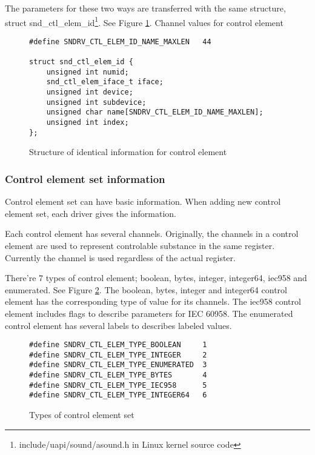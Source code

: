 \documentclass[onecolumn]{article}
\begin{document}
The parameters for these two ways are transferred with the same structure, struct snd\_ctl\_elem\_id\footnote{include/uapi/sound/asound.h in Linux kernel source code}. See Figure \ref{fig:control-element-id}.
Channel values for control element
\begin{figure}[htbp]
\small
\begin{verbatim}
#define SNDRV_CTL_ELEM_ID_NAME_MAXLEN	44

struct snd_ctl_elem_id {
    unsigned int numid;
    snd_ctl_elem_iface_t iface;
    unsigned int device;
    unsigned int subdevice;
    unsigned char name[SNDRV_CTL_ELEM_ID_NAME_MAXLEN];
    unsigned int index;
};
\end{verbatim}
\caption{{Structure of identical information for control element}}
\label{fig:control-element-id}
\end{figure}


\subsubsection{Control element set information}

Control element set can have basic information. When adding new control element set, each driver gives the information.

Each control element has several channels. Originally, the channels in a control element are used to represent controlable substance in the same register. Currently the channel is used regardless of the actual register.

There're 7 types of control element; boolean, bytes, integer, integer64, iec958 and enumerated. See Figure \ref{fig:element-set-types}. The boolean, bytes, integer and integer64 control element has the corresponding type of value for its channels. The iec958 control element includes flags to describe parameters for IEC 60958. The enumerated control element has several labels to describes labeled values.

\begin{figure}[htbp]
\small
\begin{verbatim}
#define SNDRV_CTL_ELEM_TYPE_BOOLEAN     1
#define SNDRV_CTL_ELEM_TYPE_INTEGER     2
#define SNDRV_CTL_ELEM_TYPE_ENUMERATED  3
#define SNDRV_CTL_ELEM_TYPE_BYTES       4
#define SNDRV_CTL_ELEM_TYPE_IEC958      5
#define SNDRV_CTL_ELEM_TYPE_INTEGER64   6
\end{verbatim}
\caption{{Types of control element set}}
\label{fig:element-set-types}
\end{figure}
\end{document}
